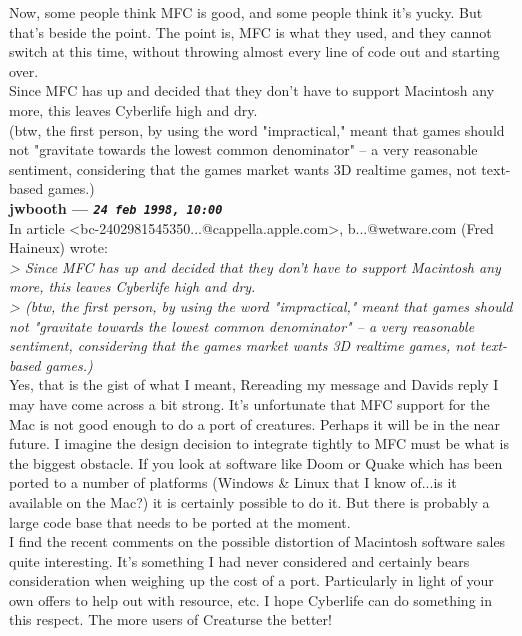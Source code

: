 \documentclass[11pt,twoside,a4paper]{article}
\begin{document}
\begin{multicols*}{2}
Now, some people think MFC is good, and some people think it's yucky. But that's beside the point. The point is, MFC is what they used, and they cannot switch at this time, without throwing almost every line of code out and starting over.~\\

Since MFC has up and decided that they don't have to support Macintosh any more, this leaves Cyberlife high and dry.~\\

(btw, the first person, by using the word "impractical," meant that games should not "gravitate towards the lowest common denominator" -- a very reasonable sentiment, considering that the games market wants 3D realtime games, not text-based games.)~\\

 
		
	
		
\textbf{jwbooth --- \emph{\texttt{24 feb 1998, 10:00}}}~\\

In article <bc-2402981545350...@cappella.apple.com>, b...@wetware.com (Fred Haineux) wrote:~\\
\emph{> Since MFC has up and decided that they don't have to support Macintosh any more, this leaves Cyberlife high and dry.}~\\
\emph{> (btw, the first person, by using the word "impractical," meant that games should not "gravitate towards the lowest common denominator" -- a very reasonable sentiment, considering that the games market wants 3D realtime games, not text-based games.)}~\\

Yes, that is the gist of what I meant, Rereading my message and Davids reply I may have come across a bit strong. It's unfortunate that MFC support for the Mac is not good enough to do a port of creatures. Perhaps it will be in the near future. I imagine the design decision to integrate tightly to MFC must be what is the biggest obstacle. If you look at software like Doom or Quake which has been ported to a number of platforms (Windows \& Linux that I know of...is it available on the Mac?) it is certainly possible to do it. But there is probably a large code base that needs to be ported at the moment.~\\

I find the recent comments on the possible distortion of Macintosh software sales quite interesting. It's something I had never considered and certainly bears consideration when weighing up the cost of a port. Particularly in light of your own offers to help out with resource, etc. I hope Cyberlife can do something in this respect. The more users of Creaturse the better!~\\


\end{multicols*}
\end{document}
